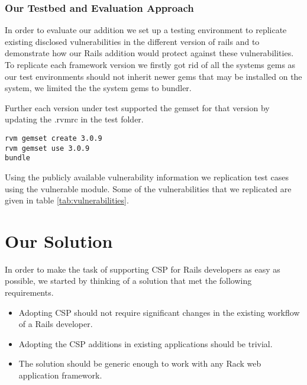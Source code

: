 \documentclass[10pt, conference, compsocconf]{IEEEtran}
\begin{document}
\subsubsection{Our Testbed and Evaluation Approach} %
\label{ssub:our_testbed_and_evaluation_approach}
In order to evaluate our addition we set up a testing environment to replicate existing disclosed vulnerabilities in the different version of rails and to demonstrate how our Rails addition would protect against these vulnerabilities. To replicate each framework version we firstly got rid of all the systems gems as our test environments should not inherit newer gems that may be installed on the system, we limited the the system gems to bundler. 

Further each version under test supported the gemset for that version by updating the .rvmrc in the test folder.

\begin{lstlisting}
rvm gemset create 3.0.9
rvm gemset use 3.0.9
bundle	
\end{lstlisting}

Using the publicly available vulnerability information we replication test cases using the vulnerable module. Some of the vulnerabilities that we replicated are given in table \ref{tab:vulnerabilities}.


\section{Our Solution} %
\label{sec:our_solution}
In order to make the task of supporting CSP for Rails developers as easy as possible, we started by thinking of a solution that met the following requirements.
\begin{itemize}

	\item Adopting CSP should not require significant changes in the existing workflow of a Rails developer.

	\item Adopting the CSP additions in existing applications should be trivial.

	\item The solution should be generic enough to work with any Rack web application framework.
\end{itemize}
\end{document}
